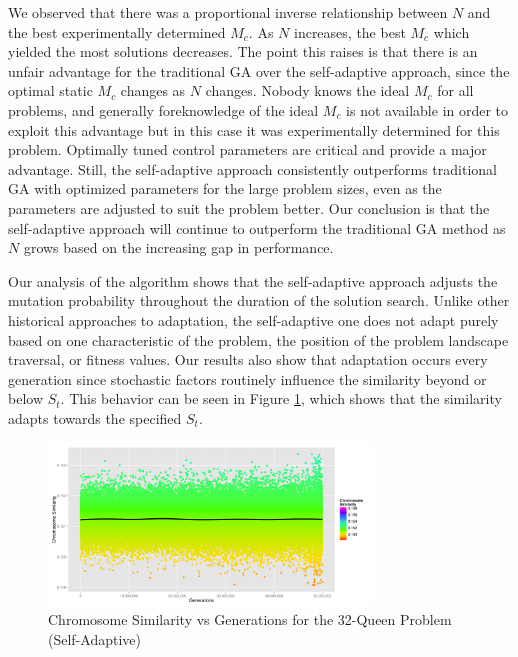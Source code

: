\documentclass[conference]{IEEEtran}
\begin{document}
We observed that there was a proportional inverse relationship between $N$ and the best experimentally determined $M_{c}$. As $N$ increases, the best $M_{c}$ which yielded the most solutions decreases. The point this raises is that there is an unfair advantage for the traditional GA over the self-adaptive approach, since the optimal static $M_{c}$ changes as $N$ changes. Nobody knows the ideal $M_{c}$ for all problems, and generally foreknowledge of the ideal $M_{c}$ is not available in order to exploit this advantage \cite{cit:14} but in this case it was experimentally determined for this problem. Optimally tuned control parameters are critical and provide a major advantage. Still, the self-adaptive approach consistently outperforms traditional GA with optimized parameters for the large problem sizes, even as the parameters are adjusted to suit the problem better. Our conclusion is that the self-adaptive approach will continue to outperform the traditional GA method as $N$ grows based on the increasing gap in performance.

Our analysis of the algorithm shows that the self-adaptive approach adjusts the mutation probability throughout the duration of the solution search. Unlike other historical approaches to adaptation, the self-adaptive one does not adapt purely based on one characteristic of the problem, the position of the problem landscape traversal, or fitness values. Our results also show that adaptation occurs every generation since stochastic factors routinely influence the similarity beyond or below $S_{t}$. This behavior can be seen in Figure \ref{fig:sim32q}, which shows that the similarity adapts towards the specified $S_{t}$.


\begin{figure}[htp]\label{fig:sim32q}
\centerline{\includegraphics[width=3.4in]{similarity_variable_32q.png}} \caption{Chromosome Similarity vs Generations for the 32-Queen Problem (Self-Adaptive)} 
\end{figure}
\end{document}
